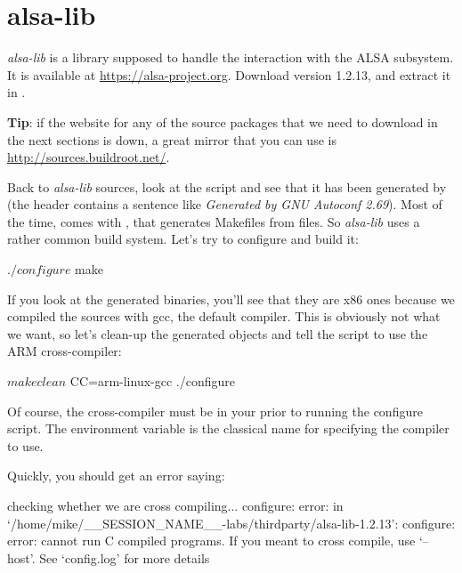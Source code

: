 \section{alsa-lib}

{\em alsa-lib} is a library supposed to handle the interaction with
the ALSA subsystem. It is available at \url{https://alsa-project.org}.
Download version 1.2.13, and extract it
in .

{\bf Tip}: if the website for any of the source packages that we
need to download in the next sections is down, a great mirror
that you can use is \url{http://sources.buildroot.net/}.

Back to {\em alsa-lib} sources, look at the  script
and see that it has been generated by  (the header
contains a sentence like {\em Generated by GNU Autoconf 2.69}). Most of
the time,  comes with , that generates
Makefiles from  files. So {\em alsa-lib} uses a rather
common build system. Let's try to configure and build it:

\begin{bashinput}
$ ./configure
$ make
\end{bashinput}

If you look at the generated binaries, you'll see that they are
x86 ones because we compiled the sources with gcc, the default compiler.
This is obviously not what we want, so let's clean-up the generated objects
and tell the  script to use the ARM cross-compiler:

\begin{bashinput}
$ make clean
$ CC=arm-linux-gcc ./configure
\end{bashinput}

Of course, the  cross-compiler must be in your
 prior to running the configure script. The  environment
variable is the classical name for specifying the compiler to
use.

Quickly, you should get an error saying:

\begin{terminaloutput}
checking whether we are cross compiling... configure: error: in `/home/mike/__SESSION_NAME__-labs/thirdparty/alsa-lib-1.2.13':
configure: error: cannot run C compiled programs.
If you meant to cross compile, use `--host'.
See `config.log' for more details
\end{terminaloutput}
\normalsize

